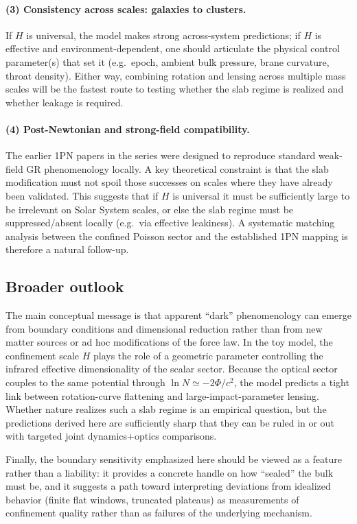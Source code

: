 \documentclass[11pt]{article}
\begin{document}
\paragraph{(3) Consistency across scales: galaxies to clusters.}
If $H$ is universal, the model makes strong across-system predictions; if $H$ is effective and
environment-dependent, one should articulate the physical control parameter(s) that set it
(e.g.\ epoch, ambient bulk pressure, brane curvature, throat density).
Either way, combining rotation and lensing across multiple mass scales will be the fastest route to
testing whether the slab regime is realized and whether leakage is required.

\paragraph{(4) Post-Newtonian and strong-field compatibility.}
The earlier 1PN papers in the series were designed to reproduce standard weak-field GR phenomenology
locally.  A key theoretical constraint is that the slab modification must not spoil those successes
on scales where they have already been validated.
This suggests that if $H$ is universal it must be sufficiently large to be irrelevant on Solar
System scales, or else the slab regime must be suppressed/absent locally (e.g.\ via effective
leakiness).
A systematic matching analysis between the confined Poisson sector and the established 1PN mapping
is therefore a natural follow-up.

\subsection{Broader outlook}
The main conceptual message is that apparent ``dark'' phenomenology can emerge from boundary
conditions and dimensional reduction rather than from new matter sources or ad hoc modifications of
the force law.
In the toy model, the confinement scale $H$ plays the role of a geometric parameter controlling the
infrared effective dimensionality of the scalar sector.
Because the optical sector couples to the same potential through $\ln N\simeq -2\Phi/c^2$, the model
predicts a tight link between rotation-curve flattening and large-impact-parameter lensing.
Whether nature realizes such a slab regime is an empirical question, but the predictions derived
here are sufficiently sharp that they can be ruled in or out with targeted joint dynamics+optics
comparisons.

Finally, the boundary sensitivity emphasized here should be viewed as a feature rather than a
liability: it provides a concrete handle on how ``sealed'' the bulk must be, and it suggests a path
toward interpreting deviations from idealized behavior (finite flat windows, truncated plateaus) as
measurements of confinement quality rather than as failures of the underlying mechanism.
\end{document}
